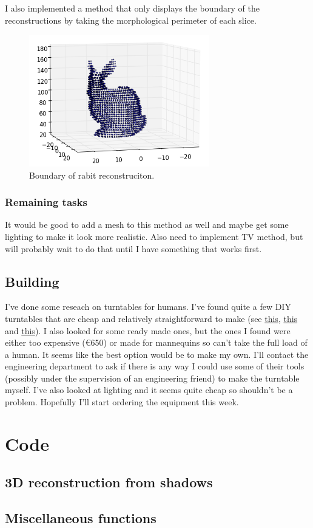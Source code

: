 \documentclass[a4paper]{article}
\begin{document}
I also implemented a method that only displays the boundary of the reconstructions by taking the morphological perimeter of each slice.

\begin{figure}[H]
  \centering
    \includegraphics[width=0.7\textwidth]{figures/rabit_ears_4.png}
    \caption{Boundary of rabit reconstruciton.}
  \label{fig:f2}
\end{figure}

\subsubsection{Remaining tasks}
It would be good to add a mesh to this method as well and maybe get some lighting to make it look more realistic.
Also need to implement TV method, but will probably wait to do that until I have something that works first.

\subsection{Building}
I've done some reseach on turntables for humans. I've found quite a few DIY turntables that are cheap and relatively straightforward to make (see \href{http://hackaday.com/2015/05/23/3d-scanning-rig-and-diy-turntable/}{this}, \href{http://www.thingiverse.com/thing:729923}{this} and \href{http://hackaday.com/2016/02/25/hacked-turntable-rotates-humans-for-3d-scanning/}{this}).
I also looked for some ready made ones, but the ones I found were either too expensive (€650) or made for mannequins so can't take the full load of a human.
It seems like the best option would be to make my own. I'll contact the engineering department to ask if there is any way I could use some of their tools (possibly under the supervision of an engineering friend) to make the turntable myself.
I've also looked at lighting and it seems quite cheap so shouldn't be a problem.
Hopefully I'll start ordering the equipment this week.

\newpage
\section{Code}
\subsection{3D reconstruction from shadows}
\label{alg:shadow}

\subsection{Miscellaneous functions}
\label{alg:misc}

\end{document}
